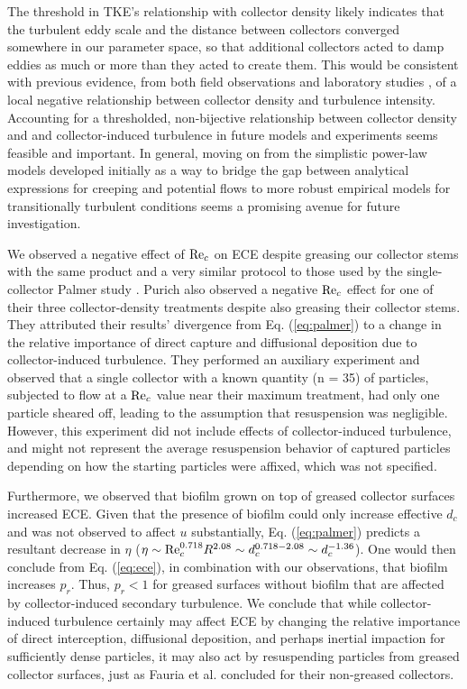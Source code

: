 \documentclass[geosciences,article,submit,moreauthors,pdftex]{Definitions/mdpi}
\begin{document}
The threshold in TKE's relationship with collector density likely indicates that the turbulent eddy scale and the distance between collectors converged somewhere in our parameter space, so that additional collectors acted to damp eddies as much or more than they acted to create them. This would be consistent with previous evidence, from both field observations \cite{leonard1995flow} and laboratory studies \cite{nepf_drag_1999, purich2006capture}, of a local negative relationship between collector density and turbulence intensity. Accounting for a thresholded, non-bijective relationship between collector density and and collector-induced turbulence in future models and experiments seems feasible and important. In general, moving on from the simplistic power-law models developed initially as a way to bridge the gap between analytical expressions for creeping and potential flows to more robust empirical models for transitionally turbulent conditions \cite{stein2020} seems a promising avenue for future investigation.

We observed a negative effect of $\mathrm{Re}_c$ on ECE despite greasing our collector stems with the same product and a very similar protocol to those used by the single-collector Palmer study \cite{Palmer_2004}. Purich also observed a negative $\mathrm{Re}_c$ effect for one of their three collector-density treatments despite also greasing their collector stems. They attributed their results' divergence from Eq. (\ref{eq:palmer}) to a change in the relative importance of direct capture and diffusional deposition due to collector-induced turbulence. They performed an auxiliary experiment and observed that a single collector with a known quantity (n = 35) of particles, subjected to flow at a $\mathrm{Re}_c$ value near their maximum treatment, had only one particle sheared off, leading to the assumption that resuspension was negligible. However, this experiment did not include effects of collector-induced turbulence, and might not represent the average resuspension behavior of captured particles depending on how the starting particles were affixed, which was not specified. 

Furthermore, we observed that biofilm grown on top of greased collector surfaces increased ECE. Given that the presence of biofilm could only increase effective $d_c$ and was not observed to affect $u$ substantially, Eq. (\ref{eq:palmer}) predicts a resultant decrease in $\eta$ ($\eta \sim \mathrm{Re}_c^{0.718}R^{2.08} \sim d_c^{0.718 - 2.08} \sim d_c^{-1.36}$). One would then conclude from Eq. (\ref{eq:ece}), in combination with our observations, that biofilm increases $p_r$. Thus, $p_r < 1$ for greased surfaces without biofilm that are affected by collector-induced secondary turbulence. We conclude that while collector-induced turbulence certainly may affect ECE by changing the relative importance of direct interception, diffusional deposition, and perhaps inertial impaction for sufficiently dense particles, it may also act by resuspending particles from greased collector surfaces, just as Fauria et al. \cite{Fauria_2015} concluded for their non-greased collectors.
\end{document}
